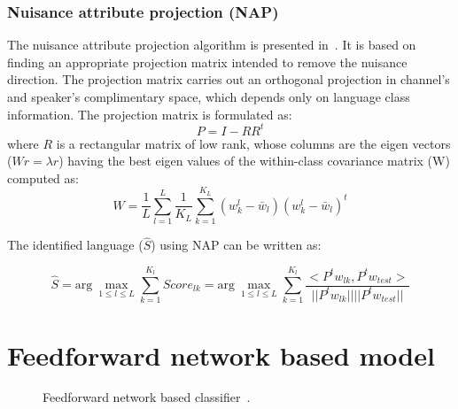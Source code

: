 \begin{spacing}{1.5}
 \subsubsection{Nuisance attribute projection (NAP)}
 The nuisance attribute projection algorithm is presented in~\cite{campbell2006svm}. It is based on finding an appropriate projection matrix intended to remove the nuisance direction. The projection matrix carries out an orthogonal projection in channel's and speaker's complimentary space, which depends only on language class information. The projection matrix is formulated as:
 \begin{equation}
     P=I-RR^{t}
 \end{equation}
 where $R$ is a rectangular matrix of low rank, whose columns are the eigen vectors ($Wr=\lambda r$) having the best eigen values of the within-class covariance matrix (W) computed as:
  \begin{equation}
      W=\frac{1}{L}\sum_{l=1}^{L}\frac{1}{K_{L}}\sum_{k=1}^{K_{L}}(w_{k}^{l}-\bar{w}_{l})(w_{k}^{l}-\bar{w}_{l})^{t}
  \end{equation}
   
 The identified language ($\hat{S}$) using NAP can be written as:
 
 \begin{equation}
     \hat{S}=\mbox{arg}~\max_{1 \leq l \leq L} \sum_{k=1}^{K_{l}} Score_{lk}=\mbox{arg}~\max_{1 \leq l \leq L} \sum_{k=1}^{K_{l}} \frac{<P^{t}w_{lk},P^{t}w_{test}>}{||P^{t}w_{lk}||||P^{t}w_{test}||}
 \end{equation} 



\section{Feedforward network based model}
\label{ffnn}
\begin{figure}[h]
\caption{Feedforward network based classifier~\cite{lopez2016use}.}
\label{ffn}
\end{figure}


\end{spacing}
